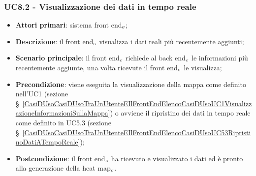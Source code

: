 \subsubsection{UC8.2 - Visualizzazione dei dati in tempo reale}\label{CasiDUsoCasiDUsoTraIlFrontEndEIlBackEndElencoDeiCasiDUsoUC82VisualizzazioneDeiDatiInTempoReale}
\begin{itemize}
	\item \textbf{Attori primari}: sistema front end$_{\scaleto{G}{3pt}}$;
	\item \textbf{Descrizione}: il front end$_{\scaleto{G}{3pt}}$ visualizza i dati reali più recentemente aggiunti;
	\item \textbf{Scenario principale}: il front end$_{\scaleto{G}{3pt}}$ richiede al back end$_{\scaleto{G}{3pt}}$ le informazioni più recentemente aggiunte, una volta ricevute il front end$_{\scaleto{G}{3pt}}$ le visualizza;
	\item \textbf{Precondizione}: viene eseguita la visualizzazione della mappa come definito nell’UC1 (sezione \S~\ref{CasiDUsoCasiDUsoTraUnUtenteEIlFrontEndElencoCasiDUsoUC1VisualizzazioneInformazioniSullaMappa}) o avviene il ripristino dei dati in tempo reale come definito in UC5.3 (sezione \S~\ref{CasiDUsoCasiDUsoTraUnUtenteEIlFrontEndElencoCasiDUsoUC53RipristinoDatiATempoReale});
	\item \textbf{Postcondizione}: il front end$_{\scaleto{G}{3pt}}$ ha ricevuto e visualizzato i dati ed è pronto alla generazione della heat map$_{\scaleto{G}{3pt}}$.
\end{itemize}

